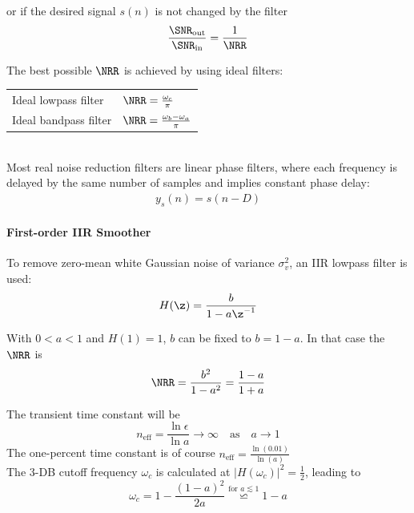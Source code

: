 or if the desired signal $s(n)$ is not changed by the filter
\begin{equation*}
	\frac{\SNR_{\text{out}}}{\SNR_{\text{in}}} = \frac{1}{\NRR}
\end{equation*}

The best possible $\NRR$ is achieved by using ideal filters:

\begin{tabularx}{\linewidth}{lX}
	Ideal lowpass filter & $\NRR = \frac{\omega_c}{\pi}$ \\
	Ideal bandpass filter & $\NRR = \frac{\omega_b - \omega_a}{\pi}$ \\
\end{tabularx} \\

Most real noise reduction filters are linear phase filters, where each frequency is delayed by the same number of samples and implies constant phase delay:
\begin{align*}
  y_s(n) = s(n-D)
\end{align*}

\paragraph{First-order IIR Smoother}
To remove zero-mean white Gaussian noise of variance $\sigma_v^2$, an
IIR lowpass filter is used:
\begin{equation*}
	H(\z) = \frac{b}{1-a\z^{-1}}
\end{equation*}

With $0 < a < 1$ and $H(1)=1$, $b$ can be fixed to $b=1-a$. In that
case the $\NRR$ is
\begin{equation*}
	\NRR = \frac{b^2}{1-a^2} = \frac{1-a}{1+a}
\end{equation*}

The transient time constant will be
\begin{equation*}
	n_{\text{eff}} = \frac{\ln \epsilon}{\ln a} \to \infty \quad \text{as} \quad a \to 1
\end{equation*}
The one-percent time constant is of course
 $n_{\text{eff}}=\frac{\ln(0.01)}{\ln(a)}$ \\

The 3-DB cutoff frequency $\omega_c$ is calculated at
$\left| H(\omega_c) \right|^2 = \frac{1}{2}$, leading to
\begin{equation*}
	\omega_c = 1 - \frac{(1-a)^2}{2 a} \stackrel{\text{for } a \lesssim 1}{\backsimeq} 1-a
\end{equation*}

